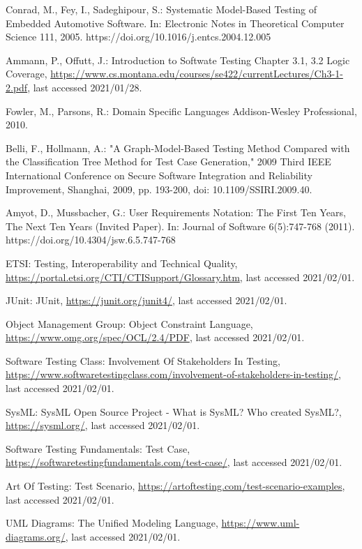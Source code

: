 \documentclass[a4paper,10pt, bibliography=totocnumbered]{scrreprt}
\begin{document}
\begin{thebibliography}{9}
 Conrad, M., Fey, I., Sadeghipour, S.: Systematic Model-Based Testing of Embedded Automotive Software. 
In: Electronic Notes in Theoretical Computer Science 111, 2005.
https://doi.org/10.1016/j.entcs.2004.12.005

 Ammann, P., Offutt, J.: Introduction to Softwate Testing Chapter 3.1, 3.2 Logic Coverage, \url{https://www.cs.montana.edu/courses/se422/currentLectures/Ch3-1-2.pdf}, last accessed 2021/01/28.

 Fowler, M., Parsons, R.: Domain Specific Languages
Addison-Wesley Professional, 2010.

 Belli, F., Hollmann, A.: "A Graph-Model-Based Testing Method Compared with the Classification Tree Method for Test Case Generation," 2009 Third IEEE International Conference on Secure Software Integration and Reliability Improvement, Shanghai, 2009, pp. 193-200, doi: 10.1109/SSIRI.2009.40.

 Amyot, D., Mussbacher, G.: User Requirements Notation: The First Ten Years, The Next Ten Years (Invited Paper). 
In: Journal of Software 6(5):747-768 (2011). 
https://doi.org/10.4304/jsw.6.5.747-768

 ETSI: Testing, Interoperability and Technical Quality, \url{https://portal.etsi.org/CTI/CTISupport/Glossary.htm}, last accessed 2021/02/01.

 JUnit: JUnit, \url{https://junit.org/junit4/}, last accessed 2021/02/01.

 Object Management Group: Object Constraint Language, \url{https://www.omg.org/spec/OCL/2.4/PDF}, last accessed 2021/02/01.

 Software Testing Class: Involvement Of Stakeholders In Testing, \url{https://www.softwaretestingclass.com/involvement-of-stakeholders-in-testing/}, last accessed 2021/02/01.

 SysML: SysML Open Source Project - What is SysML? Who created SysML?, \url{https://sysml.org/}, last accessed 2021/02/01.

 Software Testing Fundamentals: Test Case, \url{https://softwaretestingfundamentals.com/test-case/}, last accessed 2021/02/01.

 Art Of Testing: Test Scenario, \url{https://artoftesting.com/test-scenario-examples}, last accessed 2021/02/01.

 UML Diagrams: The Unified Modeling Language, \url{https://www.uml-diagrams.org/}, last accessed 2021/02/01.



\end{thebibliography}
\end{document}

